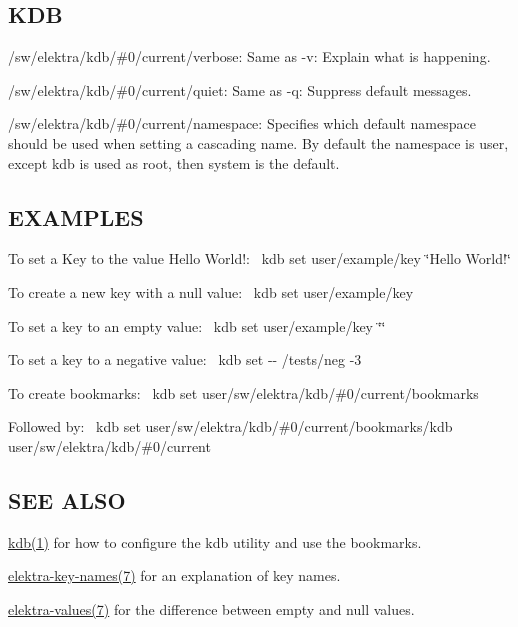 \subsection*{K\+DB}


\begin{DoxyItemize}
\item {\ttfamily /sw/elektra/kdb/\#0/current/verbose}\+: Same as {\ttfamily -\/v}\+: Explain what is happening.
\item {\ttfamily /sw/elektra/kdb/\#0/current/quiet}\+: Same as {\ttfamily -\/q}\+: Suppress default messages.
\item {\ttfamily /sw/elektra/kdb/\#0/current/namespace}\+: Specifies which default namespace should be used when setting a cascading name. By default the namespace is user, except {\ttfamily kdb} is used as root, then {\ttfamily system} is the default.
\end{DoxyItemize}

\subsection*{E\+X\+A\+M\+P\+L\+ES}

To set a Key to the value {\ttfamily Hello World!}\+:~\newline
 {\ttfamily kdb set user/example/key \char`\"{}\+Hello World!\char`\"{}}

To create a new key with a null value\+:~\newline
 {\ttfamily kdb set user/example/key}

To set a key to an empty value\+:~\newline
 {\ttfamily kdb set user/example/key \char`\"{}\char`\"{}}

To set a key to a negative value\+:~\newline
 {\ttfamily kdb set -\/-\/ /tests/neg -\/3}

To create bookmarks\+:~\newline
 {\ttfamily kdb set user/sw/elektra/kdb/\#0/current/bookmarks}

Followed by\+:~\newline
 {\ttfamily kdb set user/sw/elektra/kdb/\#0/current/bookmarks/kdb user/sw/elektra/kdb/\#0/current}

\subsection*{S\+EE A\+L\+SO}


\begin{DoxyItemize}
\item \hyperlink{doc_help_kdb_md}{kdb(1)} for how to configure the kdb utility and use the bookmarks.
\item \hyperlink{doc_help_elektra-key-names_md}{elektra-\/key-\/names(7)} for an explanation of key names.
\item \hyperlink{doc_help_elektra-values_md}{elektra-\/values(7)} for the difference between empty and null values. 
\end{DoxyItemize}